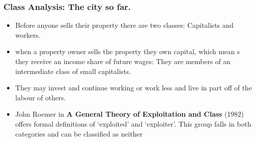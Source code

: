\documentclass[notes]{beamer}
\begin{document}
\begin{frame}\frametitle{Class Analysis: The city so far.}
\begin{itemize}
\item Before  anyone sells their property there are two classes: Capitalists and workers.
\item when a property owner sells the property they  own capital, which mean s they receive an income share of future wages: They are members of an intermediate class of small capitalists.
\item They may invest and continue working or work less and live in part off of the labour of others.  
\item John Roemer in \textbf{A General Theory of Exploitation and Class} (1982) offers  formal definitions of `exploited' and `exploiter'. This group falls in both  categories and can be classified as neither

\end {itemize}

\end{frame}
\end{document}
